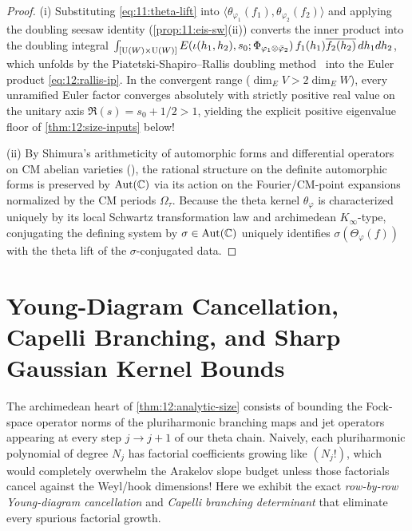 \begin{proof}
(i) Substituting \eqref{eq:11:theta-lift} into $\langle \theta_{\varphi_1}(f_1), \theta_{\varphi_2}(f_2)\rangle$ and applying the doubling seesaw identity (\cref{prop:11:eis-sw}(ii)) converts the inner product into the doubling integral $\int_{[\mathrm{U}(W) \times \mathrm{U}(W)]} E(\iota(h_1, h_2), s_0; \Phi_{\varphi_1 \otimes \bar{\varphi}_2})\, f_1(h_1)\overline{f_2(h_2)}\, dh_1 dh_2$, which unfolds by the Piatetski-Shapiro--Rallis doubling method~\cite{PSR1987,LapidRallis2005} into the Euler product \eqref{eq:12:rallis-ip}. In the convergent range ($\dim_E V > 2\dim_E W$), every unramified Euler factor converges absolutely with strictly positive real value on the unitary axis $\Re(s) = s_0 + 1/2 > 1$, yielding the explicit positive eigenvalue floor of \cref{thm:12:size-inputs} below!

(ii) By Shimura's arithmeticity of automorphic forms and differential operators on CM abelian varieties (), the rational structure on the definite automorphic forms is preserved by $\mathrm{Aut}(\mathbb{C})$ via its action on the Fourier/CM-point expansions normalized by the CM periods $\Omega_\tau$. Because the theta kernel $\theta_\varphi$ is characterized uniquely by its local Schwartz transformation law and archimedean $K_\infty$-type, conjugating the defining system by $\sigma \in \mathrm{Aut}(\mathbb{C})$ uniquely identifies $\sigma(\Theta_\varphi(f))$ with the theta lift of the $\sigma$-conjugated data.
\end{proof}

\section{Young-Diagram Cancellation, Capelli Branching, and Sharp Gaussian Kernel Bounds}
\label{sec:12:young-capelli}

The archimedean heart of \cref{thm:12:analytic-size} consists of bounding the Fock-space operator norms of the pluriharmonic branching maps and jet operators appearing at every step $j \to j + 1$ of our theta chain. Naively, each pluriharmonic polynomial of degree $N_j$ has factorial coefficients growing like $(N_j!)$, which would completely overwhelm the Arakelov slope budget unless those factorials cancel against the Weyl/hook dimensions! Here we exhibit the exact \emph{row-by-row Young-diagram cancellation} and \emph{Capelli branching determinant} that eliminate every spurious factorial growth.

